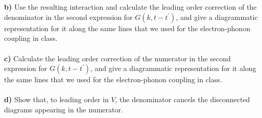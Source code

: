 \documentclass{article}
\begin{document}
\ \\
\ \\
{\bf b)} Use the resulting interaction and calculate the leading order correction of the denominator in the second expression for $G(k, t-t^{\prime})$, and give a diagrammatic representation for it along the same lines that we used for the electron-phonon coupling in class.  
\ \\
\ \\
{\bf c)} Calculate the leading order correction of the numerator in the second expression for $G(k, t-t^{\prime})$, and give a diagrammatic representation for it along the same lines that we used for the electron-phonon coupling in class.  
\ \\
\ \\
{\bf d)} Show that, to leading order in $V$, the denominator cancels the disconnected diagrams appearing in the numerator.  
\ \\
\ \\
\end{document}
